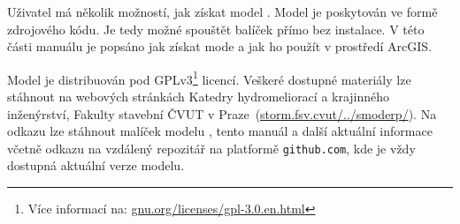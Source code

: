 Uživatel má několik možností, jak získat model \smod. 
Model \smod je poskytován ve formě zdrojového kódu. Je tedy možné spouštět 
balíček přímo bez instalace. V této části manuálu je popsáno jak získat mode \smod a jak ho použít
v prostředí ArcGIS.
  
Model \smod je distribuován pod GPLv3\footnote{Více informací na: 
\href{https://www.gnu.org/licenses/gpl-3.0.en.html}{gnu.org/licenses/gpl-3.0.en.html}} licencí. 
Veškeré dostupné  materiály lze stáhnout na webových stránkách Katedry hydromeliorací 
a krajinného inženýrství, Fakulty stavební ČVUT 
v Praze~(\href{http://storm.fsv.cvut.cz/cinnost-katedry/volne-stazitelne-vysledky/smoderp/}{storm.fsv.cvut/../smoderp/}). 
Na odkazu lze stáhnout malíček modelu \smod, tento manuál a další aktuální informace včetně odkazu na vzdálený 
repozitář na platformě {\tt github.com}, kde je vždy dostupná aktuální verze modelu. 




  
